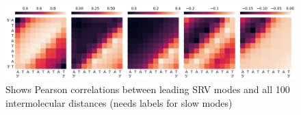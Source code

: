 \documentclass[journal=jpcbfk,manuscript=article]{achemso}
\begin{document}
\begin{figure}[ht!]
	\begin{center}
        \includegraphics[width=\textwidth]{Figs/figs_0804/AT-all_srv_correlations.png}
        \caption{Shows Pearson correlations between leading SRV modes and all 100 intermolecular distances (needs labels for slow modes)}
        \label{fig:AT-all_srv_correlations}
	\end{center}
\end{figure}
\end{document}
